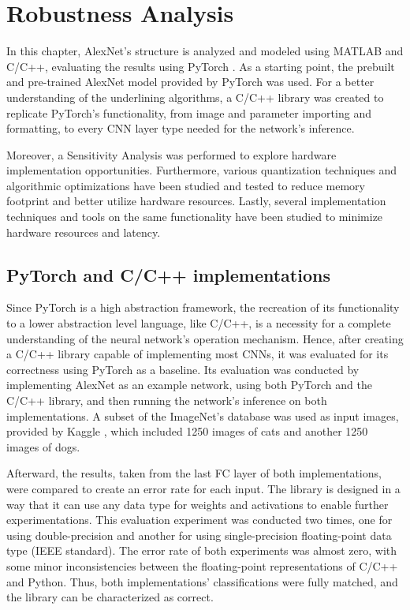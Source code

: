 \chapter{Robustness Analysis}

\label{Chapter-Robustness-Analysis}

In this chapter, AlexNet's \cite{ImageNet-classification-with-deep-convolutional-neural-networks} structure is analyzed and modeled using MATLAB \cite{MATLAB-Official-site} and C/C++, evaluating the results using PyTorch \cite{PyTorch-Official-site}. As a starting point, the prebuilt and pre-trained AlexNet model provided by PyTorch was used. For a better understanding of the underlining algorithms, a C/C++ library was created to replicate PyTorch's functionality, from image and parameter importing and formatting, to every CNN layer type needed for the network's inference.

Moreover, a Sensitivity Analysis was performed to explore hardware implementation opportunities. Furthermore, various quantization techniques and algorithmic optimizations have been studied and tested to reduce memory footprint and better utilize hardware resources. Lastly, several implementation techniques and tools on the same functionality have been studied to minimize hardware resources and latency.

\section{PyTorch and C/C++ implementations}
Since PyTorch is a high abstraction framework, the recreation of its functionality to a lower abstraction level language, like C/C++, is a necessity for a complete understanding of the neural network's operation mechanism. Hence, after creating a C/C++ library capable of implementing most CNNs, it was evaluated for its correctness using PyTorch as a baseline. Its evaluation was conducted by implementing AlexNet as an example network, using both PyTorch and the C/C++ library, and then running the network's inference on both implementations. A subset of the ImageNet's database was used as input images, provided by Kaggle \cite{Kaggle}, which included 1250 images of cats and another 1250 images of dogs.

Afterward, the results, taken from the last FC layer of both implementations, were compared to create an error rate for each input. The library is designed in a way that it can use any data type for weights and activations to enable further experimentations. This evaluation experiment was conducted two times, one for using double-precision and another for using single-precision floating-point data type (IEEE standard). The error rate of both experiments was almost zero, with some minor inconsistencies between the floating-point representations of C/C++ and Python. Thus, both implementations' classifications were fully matched, and the library can be characterized as correct.

